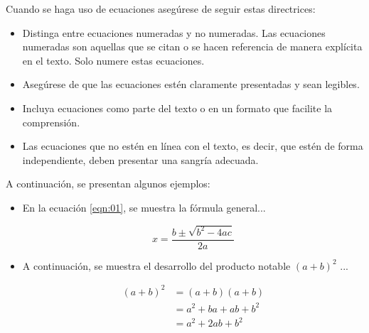 \documentclass[fleqn]{Paquetes/RevDigMatEduInt}
\begin{document}
Cuando se haga uso de ecuaciones asegúrese de seguir estas directrices:

\begin{itemize}
\item Distinga entre ecuaciones numeradas y no numeradas. Las ecuaciones numeradas son aquellas que se citan o se hacen referencia de manera explícita en el texto. Solo numere estas ecuaciones.
\item Asegúrese de que las ecuaciones estén claramente presentadas y sean legibles.
\item Incluya ecuaciones como parte del texto o en un formato que facilite la comprensión.
\item Las ecuaciones que no estén en línea con el texto, es decir, que estén de forma independiente, deben presentar una sangría adecuada.
\end{itemize}

A continuación, se presentan algunos ejemplos:

\begin{itemize}

\item En la ecuación \ref{eqn:01}, se muestra la fórmula general...


\begin{equation}
	x=\frac{b\pm \sqrt{b^2-4ac}}{2a}
	\label{eqn:01}
\end{equation}

\item A continuación, se muestra el desarrollo del producto notable $(a+b)^2$ ...

\begin{align*}
	(a+b)^2 & = (a+b)(a+b) \\
	& = a^2+ba+ab+b^2\\
	& = a^2+2ab+b^2\\
\end{align*}


\end{itemize}
\end{document}
